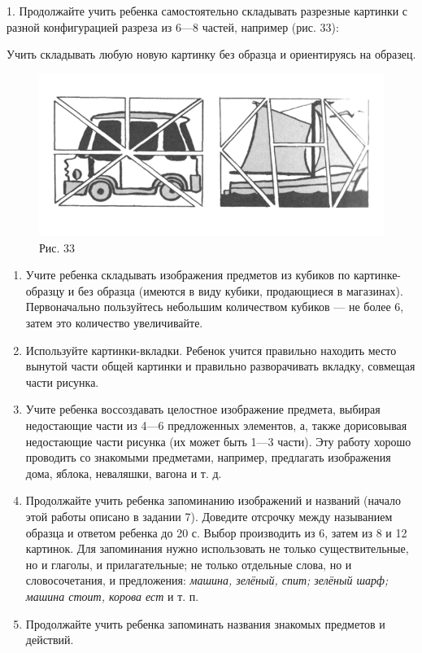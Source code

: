 \documentclass{book}
\renewcommand{\emph}[1]{\textit{#1}}
\begin{document}
1. Продолжайте учить ребенка самостоятельно складывать разрезные
картинки с разной конфигурацией разреза из 6---8 частей, например (рис.
33):

Учить складывать любую новую картинку без образца и ориентируясь на
образец.

\begin{figure}
\centering
\includegraphics[width=\linewidth]{media/media/image30.png}
\caption*{Рис. 33}
\end{figure}


\begin{enumerate}
\def\labelenumi{\arabic{enumi}.}
\setcounter{enumi}{1}
\item
  
  Учите ребенка складывать изображения предметов из кубиков по
  картинке-образцу и без образца (имеются в виду кубики, продающиеся в
  магазинах). Первоначально пользуйтесь небольшим количеством кубиков
  --- не более 6, затем это количество увеличивайте.
  
\item
  
  Используйте картинки-вкладки. Ребенок учится правильно находить место
  вынутой части общей картинки и правильно разворачивать вкладку,
  совмещая части рисунка.
  
\item
  
  Учите ребенка воссоздавать целостное изображение предмета, выбирая
  недостающие части из 4---6 предложенных элементов, а, также
  дорисовывая недостающие части рисунка (их может быть 1---3 части). Эту
  работу хорошо проводить со знакомыми предметами, например, предлагать
  изображения дома, яблока, неваляшки, вагона и т. д.
  
\item
  
  Продолжайте учить ребенка запоминанию изображений и названий (начало
  этой работы описано в задании 7). Доведите отсрочку между называнием
  образца и ответом ребенка до 20 с. Выбор производить из 6, затем из 8
  и 12 картинок. Для запоминания нужно использовать не только
  существительные, но и глаголы, и прилагательные; не только отдельные
  слова, но и словосочетания, и предложения: \emph{машина, зелёный,
  спит; зелёный шарф; машина стоит, корова ест} и т. п.
  
\item
  
  Продолжайте учить ребенка запоминать названия знакомых предметов и
  действий.
  
\end{enumerate}
\end{document}
